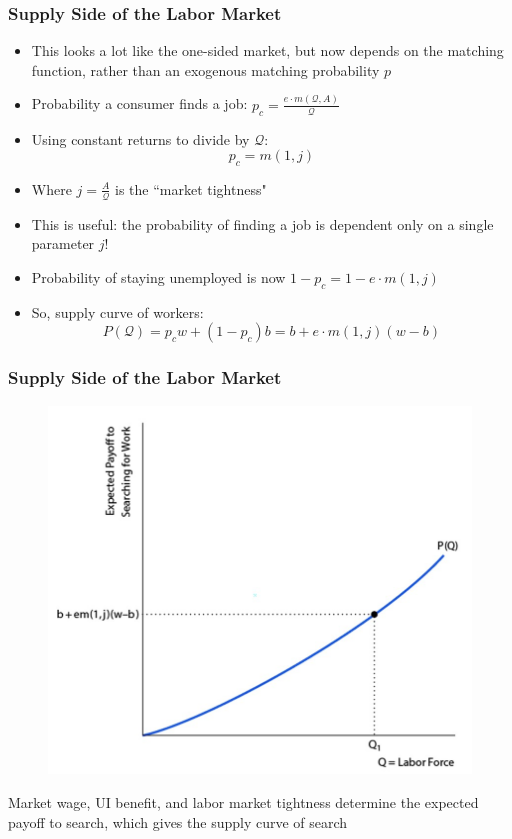 \documentclass{beamer}
\begin{document}
\begin{frame}
\frametitle[alignment=center]{Supply Side of the Labor Market}
\begin{itemize}
\item This looks a lot like the one-sided market, but now depends on the matching function, rather than an exogenous matching probability $p$
\bigskip
\item Probability a consumer finds a job: $p_c=\frac{e\cdot m(\mathcal{Q},A)}{\mathcal{Q}}$
\bigskip
\item Using constant returns to divide by $\mathcal{Q}$:
$$p_c=m(1,j)$$
\item Where $j=\frac{A}{\mathcal{Q}}$ is the ``market tightness"
\bigskip
\item This is useful:  the probability of finding a job is dependent only on a single parameter $j$!
\bigskip
\item Probability of staying unemployed is now $1-p_c=1-e\cdot m(1,j)$
\bigskip
\item So, supply curve of workers:
$$P(\mathcal{Q})=p_cw+(1-p_c)b=b+e\cdot m(1,j)(w-b)$$
\end{itemize}
\end{frame}
 
\begin{frame}
\frametitle[alignment=center]{Supply Side of the Labor Market}
\begin{figure}
\centering
\includegraphics[scale=0.5]{Figures/W_Fig_6pt18.png}
\end{figure}
Market wage, UI benefit, and labor market tightness determine the expected payoff to search, which gives the supply curve of search
\end{frame}
\end{document}
